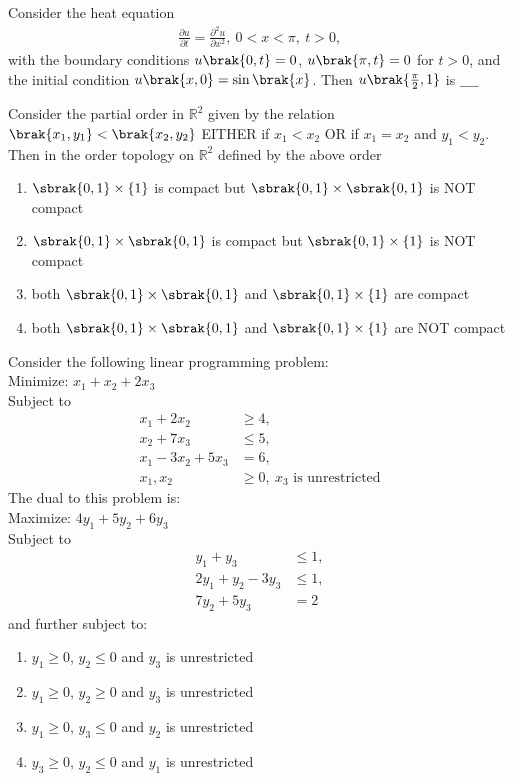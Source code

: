 \item Consider the heat equation
\begin{align*}
    \frac{\partial u}{\partial t} = \frac{\partial^2 u}{\partial x^2},\ 0 < x < \pi,\ t > 0,
\end{align*}
with the boundary conditions $u\brak{0, t} = 0$, $u\brak{\pi, t} = 0$ for $t > 0$, and the initial condition $u\brak{x, 0}= \sin\brak{x}$. Then $u\brak{\frac{\pi}{2}, 1}$ is $\_\_\_\_$ \\
\item Consider the partial order in $\mathbb{R}^2$ given by the relation $\brak{x_1, y_1} < \brak{x_2, y_2}$ EITHER if $x_1 < x_2$ OR if $x_1 = x_2$ and $y_1 < y_2$. Then in the order topology on $\mathbb{R}^2$ defined by the above order
\begin{enumerate}
    \item $\sbrak{0, 1} \times \{1\}$ is compact but $\sbrak{0, 1} \times \sbrak{0, 1}$ is NOT compact
    \item $\sbrak{0, 1} \times \sbrak{0, 1}$ is compact but $\sbrak{0, 1} \times \{1\}$ is NOT compact
    \item both $\sbrak{0, 1} \times \sbrak{0, 1}$ and $\sbrak{0, 1} \times \{1\}$ are compact
    \item both $\sbrak{0, 1} \times \sbrak{0, 1}$ and $\sbrak{0, 1} \times \{1\}$ are NOT compact \\
\end{enumerate}
\item Consider the following linear programming problem: \\
Minimize: $x_1 + x_2 + 2x_3$ \\
Subject to
\begin{align*}
    x_1 + 2x_2 & \geq 4, \\
    x_2 + 7x_3 & \leq 5, \\
    x_1 - 3x_2 + 5x_3 & = 6, \\
    x_1, x_2 & \geq 0,\ x_3 \text{ is unrestricted}
\end{align*}
The dual to this problem is: \\
Maximize: $4y_1 + 5y_2 + 6y_3$ \\
Subject to
\begin{align*}
    y_1 + y_3 & \leq 1, \\
    2y_1 + y_2 - 3y_3 & \leq 1, \\
    7y_2 + 5y_3 & = 2
\end{align*}
and further subject to:
  \begin{enumerate}
   \item $y_1 \geq 0$, $y_2 \leq 0$ and $y_3$ is unrestricted
   \item $y_1 \geq 0$, $y_2 \geq 0$ and $y_3$ is unrestricted
   \item $y_1 \geq 0$, $y_3 \leq 0$ and $y_2$ is unrestricted
   \item $y_3 \geq 0$, $y_2 \leq 0$ and $y_1$ is unrestricted \\
\end{enumerate}
